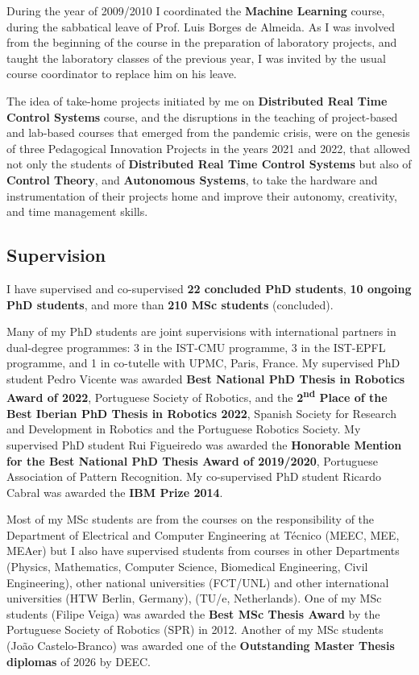 \documentclass[
]{article}
\begin{document}
During the year of 2009/2010 I coordinated the \textbf{Machine Learning}
course, during the sabbatical leave of Prof. Luis Borges de Almeida. As
I was involved from the beginning of the course in the preparation of
laboratory projects, and taught the laboratory classes of the previous
year, I was invited by the usual course coordinator to replace him on
his leave.

The idea of take-home projects initiated by me on \textbf{Distributed
Real Time Control Systems} course, and the disruptions in the teaching
of project-based and lab-based courses that emerged from the pandemic
crisis, were on the genesis of three Pedagogical Innovation Projects in
the years 2021 and 2022, that allowed not only the students of
\textbf{Distributed Real Time Control Systems} but also of
\textbf{Control Theory}, and \textbf{Autonomous Systems}, to take the
hardware and instrumentation of their projects home and improve their
autonomy, creativity, and time management skills.

\subsection{Supervision}\label{supervision}

I have supervised and co-supervised \textbf{22 concluded PhD students},
\textbf{10 ongoing PhD students}, and more than \textbf{210 MSc
students} (concluded).

Many of my PhD students are joint supervisions with international
partners in dual-degree programmes: 3 in the IST-CMU programme, 3 in the
IST-EPFL programme, and 1 in co-tutelle with UPMC, Paris, France. My
supervised PhD student Pedro Vicente was awarded \textbf{Best National
PhD Thesis in Robotics Award of 2022}, Portuguese Society of Robotics,
and the \textbf{2\textsuperscript{nd} Place of the Best Iberian PhD
Thesis in Robotics 2022}, Spanish Society for Research and Development
in Robotics and the Portuguese Robotics Society. My supervised PhD
student Rui Figueiredo was awarded the \textbf{Honorable Mention for the
Best National PhD Thesis Award of 2019/2020}, Portuguese Association of
Pattern Recognition. My co-supervised PhD student Ricardo Cabral was
awarded the \textbf{IBM Prize 2014}.

Most of my MSc students are from the courses on the responsibility of
the Department of Electrical and Computer Engineering at Técnico (MEEC,
MEE, MEAer) but I also have supervised students from courses in other
Departments (Physics, Mathematics, Computer Science, Biomedical
Engineering, Civil Engineering), other national universities (FCT/UNL)
and other international universities (HTW Berlin, Germany), (TU/e,
Netherlands). One of my MSc students (Filipe Veiga) was awarded the
\textbf{Best MSc Thesis Award} by the Portuguese Society of Robotics
(SPR) in 2012. Another of my MSc students (João Castelo-Branco) was
awarded one of the \textbf{Outstanding Master Thesis diplomas} of 2026
by DEEC.
\end{document}
